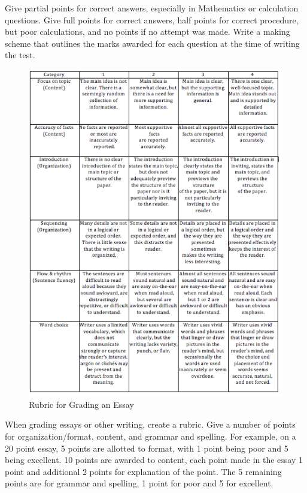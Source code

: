 Give partial points for correct answers, especially in Mathematics or calculation questions.  Give full points for correct answers, half points for correct procedure, but poor calculations, and no points if no attempt was made.  Write a making scheme that outlines the marks awarded for each question at the time of writing the test.

\begin{figure}[h!]
\begin{center}
\includegraphics[scale=1]{./img/picture-10.png} 
\caption{Rubric for Grading an Essay}
\end{center}
\end{figure}

When grading essays or other writing, create a rubric.  Give a number of points for organization/format, content, and grammar and spelling.  For example, on a 20 point essay, 5 points are allotted to format, with 1 point being poor and 5 being excellent.  10 points are awarded to content, each point made in the essay 1 point and additional 2 points for explanation of the point.  The 5 remaining points are for grammar and spelling, 1 point for poor and 5 for excellent.


